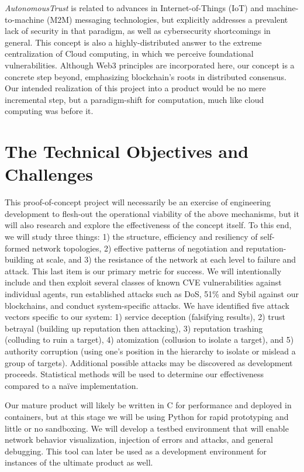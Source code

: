 \documentclass[10pt, twoside]{article}
\newcommand{\projectName}{\emph{AutonomousTrust }}
\begin{document}
\projectName is related to advances in Internet-of-Things (IoT) and machine-to-machine (M2M) messaging technologies, but explicitly addresses a prevalent lack of security in that paradigm, as well as cybersecurity shortcomings in general. This concept is also a highly-distributed answer to the extreme centralization of Cloud computing, in which we perceive foundational vulnerabilities. Although Web3 principles are incorporated here, our concept is a concrete step beyond, emphasizing blockchain's roots in distributed consensus. Our intended realization of this project into a product would be no mere incremental step, but a paradigm-shift for computation, much like cloud computing was before it.

\section{The Technical Objectives and Challenges}

This proof-of-concept project will necessarily be an exercise of engineering development to flesh-out the operational viability of the above mechanisms, but it will also research and explore the effectiveness of the concept itself. To this end, we will study three things: 1) the structure, efficiency and resiliency of self-formed network topologies, 2) effective patterns of negotiation and reputation-building at scale, and 3) the resistance of the network at each level to failure and attack. This last item is our primary metric for success. We will intentionally include and then exploit several classes of known CVE vulnerabilities against individual agents, run established attacks such as DoS, 51\% and Sybil against our blockchains, and conduct system-specific attacks. We have identified five attack vectors specific to our system: 1) service deception (falsifying results), 2) trust betrayal (building up reputation then attacking), 3) reputation trashing (colluding to ruin a target), 4) atomization (collusion to isolate a target), and 5) authority corruption (using one's position in the hierarchy to isolate or mislead a group of targets). Additional possible attacks may be discovered as development proceeds. Statistical methods will be used to determine our effectiveness compared to a na\"ive implementation.

Our mature product will likely be written in C for performance and deployed in containers, but at this stage we will be using Python for rapid prototyping and little or no sandboxing. We will develop a testbed environment that will enable network behavior visualization, injection of errors and attacks, and general debugging. This tool can later be used as a development environment for instances of the ultimate product as well.
\end{document}
